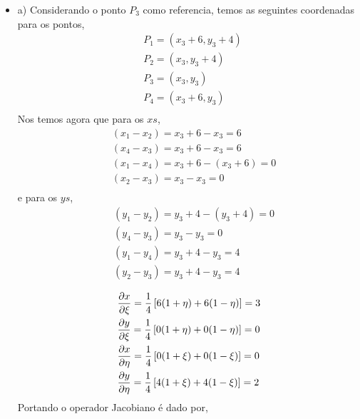 \begin{itemize}
	\item a)
	Considerando o ponto $P_3$ como referencia, temos as seguintes coordenadas para os pontos,
	\begin{equation}
		\begin{split}
			&	P_1 = (x_3 + 6, y_3 + 4)\\
			&	P_2 = (x_3    , y_3 + 4)\\
			&	P_3 = (x_3    , y_3    )\\
			&	P_4 = (x_3 + 6, y_3    )\\
		\end{split}
	\end{equation}
	Nos temos agora que para os $xs$,
	\begin{equation}
		\begin{split}
			&	(x_1 - x_2) = x_3 + 6 - x_3 = 6 \\
			&	(x_4 - x_3) = x_3 + 6 - x_3 = 6\\
			&	(x_1 - x_4) = x_3 + 6 - (x_3 + 6) = 0\\\
			&	(x_2 - x_3) = x_3 - x_3 = 0\\
		\end{split}
	\end{equation}
	e para os $ys$,
	\begin{equation}
	\begin{split}
		&	(y_1 - y_2) = y_3 + 4 - (y_3 + 4) = 0 \\
		&	(y_4 - y_3) = y_3 - y_3 = 0\\
		&	(y_1 - y_4) = y_3 + 4 - y_3 = 4\\\
		&	(y_2 - y_3) = y_3 + 4 - y_3 = 4\\
	\end{split}
	\end{equation}
	\begin{equation}
		\begin{split}
			&	\frac{\partial x}{\partial \xi } = \frac{1}{4}\left[ 6(1 + \eta) + 6(1 - \eta) \right] = 3\\
			&   \frac{\partial y}{\partial \xi } = \frac{1}{4}\left[ 0(1 + \eta) + 0(1 - \eta) \right] = 0\\
			&   \frac{\partial x}{\partial \eta} = \frac{1}{4}\left[ 0(1 + \xi ) + 0(1 - \xi ) \right] = 0\\
			&   \frac{\partial y}{\partial \eta} = \frac{1}{4}\left[ 4(1 + \xi ) + 4(1 - \xi ) \right] = 2
		\end{split}
	\end{equation}
	Portando o operador Jacobiano é dado por,


\end{itemize}
